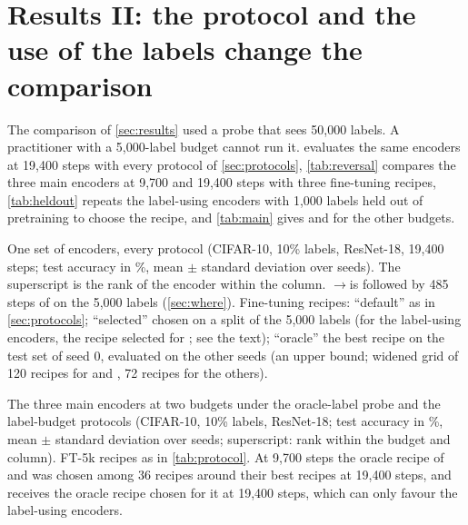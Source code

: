 \section{Results II: the protocol and the use of the labels change the comparison}
\label{sec:protocol}

The comparison of \cref{sec:results} used a probe that sees 50,000 labels. A practitioner with a 5,000-label
budget cannot run it.  evaluates the same encoders at 19,400 steps with every protocol of
\cref{sec:protocols}, \cref{tab:reversal} compares the three main encoders at 9,700 and 19,400 steps with three
fine-tuning recipes, \cref{tab:heldout} repeats the label-using encoders with 1,000 labels held out of pretraining
to choose the recipe, and \cref{tab:main} gives \lpfive and \ftfive for the other budgets.

\begin{table}[t]
\centering
\small
\caption{One set of encoders, every protocol (CIFAR-10, 10\% labels, ResNet-18, 19,400 steps; test accuracy
in \%, mean $\pm$ standard deviation over seeds). The superscript is the rank of the encoder within the
column. \simclr{}$\to$\supcon is \simclr followed by 485 steps of \supcon on the 5,000 labels
(\cref{sec:where}). Fine-tuning recipes: ``default'' as in \cref{sec:protocols}; ``selected'' chosen on a split
of the 5,000 labels (for the label-using encoders, the recipe selected for \simclr; see the text); ``oracle'' the
best recipe on the test set of seed 0, evaluated on the other seeds (an upper bound; widened grid of 120
recipes for \supcon and \union, 72 recipes for the others).}
\label{tab:protocol}
\begin{adjustbox}{max width=\linewidth}

\end{adjustbox}
\end{table}

\begin{table}[t]
\centering
\small
\caption{The three main encoders at two budgets under the oracle-label probe and the label-budget protocols
(CIFAR-10, 10\% labels, ResNet-18; test accuracy in \%, mean $\pm$ standard deviation over seeds; superscript:
rank within the budget and column). FT-5k recipes as in \cref{tab:protocol}. At 9,700 steps the oracle recipe of
\supcon and \union was chosen among 36 recipes around their best recipes at 19,400 steps, and \simclr receives
the oracle recipe chosen for it at 19,400 steps, which can only favour the label-using encoders.}
\label{tab:reversal}
\begin{adjustbox}{max width=\linewidth}

\end{adjustbox}
\end{table}


